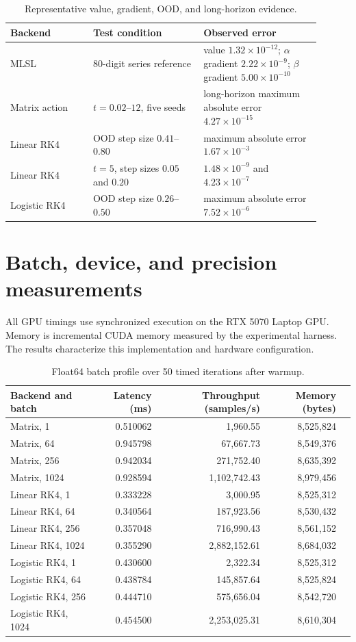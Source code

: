 \documentclass[preprint,12pt]{elsarticle}
\begin{document}
\begin{table}[htbp]
\centering
\caption{Representative value, gradient, OOD, and long-horizon evidence.}
\label{tab:s2}
\small
\begin{tabular}{p{0.24\linewidth}p{0.32\linewidth}p{0.34\linewidth}}
\toprule
Backend & Test condition & Observed error\\
\midrule
MLSL & 80-digit series reference & value $1.32\times10^{-12}$; $\alpha$ gradient $2.22\times10^{-9}$; $\beta$ gradient $5.00\times10^{-10}$\\
Matrix action & $t=0.02$--$12$, five seeds & long-horizon maximum absolute error $4.27\times10^{-15}$\\
Linear RK4 & OOD step size $0.41$--$0.80$ & maximum absolute error $1.67\times10^{-3}$\\
Linear RK4 & $t=5$, step sizes $0.05$ and $0.20$ & $1.48\times10^{-9}$ and $4.23\times10^{-7}$\\
Logistic RK4 & OOD step size $0.26$--$0.50$ & maximum absolute error $7.52\times10^{-6}$\\
\bottomrule
\end{tabular}
\end{table}

\section{Batch, device, and precision measurements}
All GPU timings use synchronized execution on the RTX 5070 Laptop GPU. Memory is incremental CUDA memory measured by the experimental harness. The results characterize this implementation and hardware configuration.

\begin{table}[htbp]
\centering
\caption{Float64 batch profile over 50 timed iterations after warmup.}
\label{tab:s3}
\scriptsize
\begin{tabular}{lrrrr}
\toprule
Backend and batch & Latency (ms) & Throughput (samples/s) & Memory (bytes)\\
\midrule
Matrix, 1 & 0.510062 & 1,960.55 & 8,525,824\\
Matrix, 64 & 0.945798 & 67,667.73 & 8,549,376\\
Matrix, 256 & 0.942034 & 271,752.40 & 8,635,392\\
Matrix, 1024 & 0.928594 & 1,102,742.43 & 8,979,456\\
Linear RK4, 1 & 0.333228 & 3,000.95 & 8,525,312\\
Linear RK4, 64 & 0.340564 & 187,923.56 & 8,530,432\\
Linear RK4, 256 & 0.357048 & 716,990.43 & 8,561,152\\
Linear RK4, 1024 & 0.355290 & 2,882,152.61 & 8,684,032\\
Logistic RK4, 1 & 0.430600 & 2,322.34 & 8,525,312\\
Logistic RK4, 64 & 0.438784 & 145,857.64 & 8,525,824\\
Logistic RK4, 256 & 0.444710 & 575,656.04 & 8,542,720\\
Logistic RK4, 1024 & 0.454500 & 2,253,025.31 & 8,610,304\\
\bottomrule
\end{tabular}
\end{table}
\end{document}
